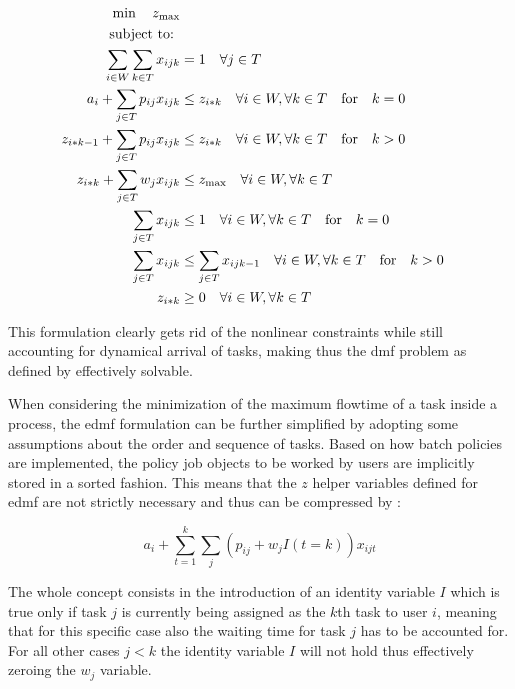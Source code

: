 \documentclass[draft=false]{seal_thesis}
\begin{document}
\begin{align}
    \min \quad z_{\text{max}}\\
    \text{subject to: } \notag \\
    \sum_{i \in W} \sum_{k \in T} x_{ijk} &= 1 \quad \forall j \in T\\
    a_i + \sum_{j \in T} p_{ij} x_{ijk} &\leq z_{i*k} \quad \forall i \in W, \forall k \in T \quad \text{for} \quad k=0\\
    z_{i*k-1} + \sum_{j \in T} p_{ij} x_{ijk} &\leq z_{i*k} \quad \forall i \in W, \forall k \in T \quad \text{for} \quad k>0\\
    z_{i*k}+ \sum_{j \in T} w_j x_{ijk} &\leq z_{\text{max}} \quad \forall i \in W, \forall k \in T\\
    \sum_{j \in T} x_{ijk} &\leq 1 \quad \forall i \in W, \forall k \in T \quad \text{for} \quad k=0\\
    \sum_{j \in T} x_{ijk} &\leq \sum_{j \in T} x_{ijk-1} \quad \forall i \in W, \forall k \in T \quad \text{for} \quad k>0\\
    z_{i*k} &\geq 0 \quad \forall i \in W, \forall k \in T
\end{align}

This formulation clearly gets rid of the nonlinear constraints while still accounting for dynamical arrival of tasks, making thus the \gls{dmf} problem as defined by \citet{Zeng2005} effectively solvable.

When considering the minimization of the maximum flowtime of a task inside a process, the \gls{edmf} formulation can be further simplified by adopting some assumptions about the order and sequence of tasks. Based on how batch policies are implemented, the policy job objects to be worked by users are implicitly stored in a sorted fashion. This means that the $z$ helper variables defined for \gls{edmf} are not strictly necessary and thus can be compressed by :

\begin{equation}
\label{eq:simplified_z_with_k}
	a_i + \sum_{t=1}^k \sum_j (p_{ij} + w_j I(t=k))x_{ijt}
\end{equation}

The whole concept consists in the introduction of an identity variable $I$ which is true only if task $j$ is currently being assigned as the $k$th task to user $i$, meaning that for this specific case also the waiting time for task $j$ has to be accounted for. For all other cases \ie $j<k$ the identity variable $I$ will not hold thus effectively zeroing the $w_j$ variable.
\end{document}
